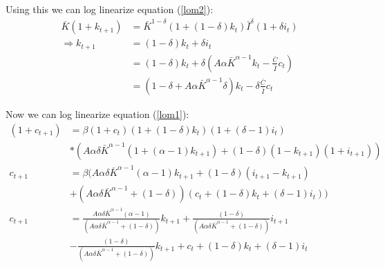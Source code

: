 \documentclass[11pt]{article} %
\begin{document}
Using this we can log linearize equation (\ref{lom2}):
\begin{align*}
\bar{K}(1+k_{t+1}) &= \bar{K}^{1-\delta}(1+(1-\delta)k_t)\bar{I}^{\delta}(1+\delta i_t)\\
\Rightarrow k_{t+1} &= (1-\delta)k_t + \delta i_t\\
&= (1-\delta)k_t + \delta \left( A\alpha\bar{K}^{\alpha - 1}k_t - \frac{\bar{C}}{\bar{I}}c_t \right)\\
&= (1-\delta + A\alpha\bar{K}^{\alpha - 1}\delta) k_t - \delta\frac{\bar{C}}{\bar{I}}c_t
\end{align*}

Now we can log linearize equation (\ref{lom1}):
\begin{align*}
(1+c_{t+1}) &= \beta (1+c_{t}) (1+(1-\delta)k_t) (1+(\delta - 1)i_t)\\ &*(A\alpha \delta \bar{K}^{\alpha - 1}(1+(\alpha -1)k_{t+1}) + (1-\delta)(1-k_{t+1})(1+i_{t+1}))\\
c_{t+1} &= \beta (A\alpha\delta\bar{K}^{\alpha-1}(\alpha - 1)k_{t+1} + (1-\delta)(i_{t+1} - k_{t+1})\\ &+ (A\alpha\delta\bar{K}^{\alpha-1} + (1-\delta))(c_t + (1-\delta)k_t + (\delta - 1)i_t))\\
c_{t+1} &= \frac{A\alpha \delta \bar{K}^{\alpha-1}(\alpha -1)}{(A\alpha\delta\bar{K}^{\alpha-1} + (1-\delta))}k_{t+1} +  \frac{ (1-\delta)}{(A\alpha\delta\bar{K}^{\alpha-1} + (1-\delta))} i_{t+1} \\
&-   \frac{ (1-\delta)}{(A\alpha\delta\bar{K}^{\alpha-1} + (1-\delta))} k_{t+1} + c_t + (1-\delta)k_t + (\delta - 1)i_t
\end{align*}
\end{document}
